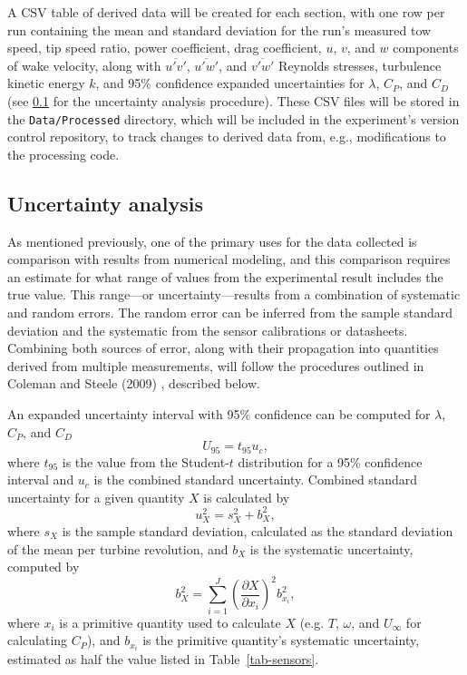 \documentclass[12pt,letterpaper]{scrreprt}
\begin{document}
A CSV table of derived data will be created for each section, with one row per
run containing the mean and standard deviation for the run's measured tow speed,
tip speed ratio, power coefficient, drag coefficient, $u$, $v$, and $w$
components of wake velocity, along with $\overline{u'v'}$, $\overline{u'w'}$,
and $\overline{v'w'}$ Reynolds stresses, turbulence kinetic energy $k$, and 95\%
confidence expanded uncertainties for $\lambda$, $C_P$, and $C_D$ (see
\ref{heading-uncertainty} for the uncertainty analysis procedure). These CSV
files will be stored in the \texttt{Data/Processed} directory, which will be
included in the experiment's version control repository, to track changes to
derived data from, e.g., modifications to the processing code.

\subsection{Uncertainty analysis}\label{heading-uncertainty}

As mentioned previously, one of the primary uses for the data collected is
comparison with results from numerical modeling, and this comparison requires an
estimate for what range of values from the experimental result includes the true
value. This range---or uncertainty---results from a combination of systematic
and random errors. The random error can be inferred from the sample standard
deviation and the systematic from the sensor calibrations or datasheets.
Combining both sources of error, along with their propagation into quantities
derived from multiple measurements, will follow the procedures outlined in
Coleman and Steele (2009) \cite{ColemanSteele}, described below.

An expanded uncertainty interval with 95\% confidence can be computed for
$\lambda$, $C_P$, and $C_D$
\begin{equation}
U_{95} = t_{95} u_c,
\end{equation}
where $t_{95}$ is the value from the Student-$t$ distribution for a 95\%
confidence interval and $u_c$ is the combined standard uncertainty. Combined
standard uncertainty for a given quantity $X$ is calculated by
\begin{equation}
u_X^2 = s_X^2 + b_X^2,
\end{equation}
where $s_X$ is the sample standard deviation, calculated as the standard
deviation of the mean per turbine revolution, and $b_X$ is the systematic
uncertainty, computed by
\begin{equation}
b_{X}^2 = \sum_{i=1}^J \left( \frac{\partial X}{\partial x_i} \right)^2 b_{x_i}^2,
\end{equation}
where $x_i$ is a primitive quantity used to calculate $X$ (e.g. $T$, $\omega$,
and $U_\infty$ for calculating $C_P$), and $b_{x_i}$ is the primitive quantity's
systematic uncertainty, estimated as half the value listed in
Table~\ref{tab-sensors}.
\end{document}
